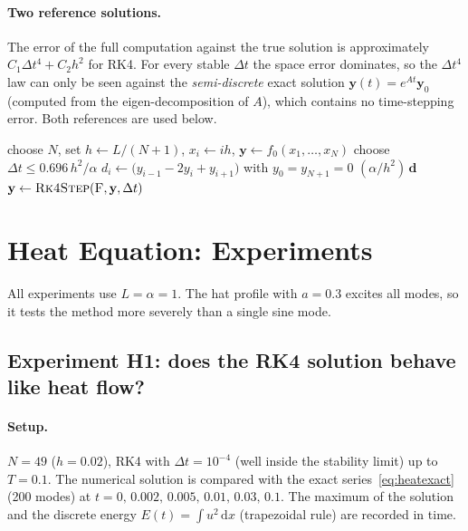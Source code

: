 \documentclass[11pt,a4paper]{article}
\newcommand{\dd}{\mathrm{d}}
\newcommand{\Dt}{\Delta t}
\newcommand{\bfy}{\mathbf{y}}
\begin{document}
\paragraph{Two reference solutions.} The error of the full computation against the true solution is
approximately $C_1\Dt^4+C_2h^2$ for RK4. For every stable $\Dt$ the space error dominates, so the
$\Dt^4$ law can only be seen against the \emph{semi-discrete} exact solution
$\bfy(t)=e^{At}\bfy_0$ (computed from the eigen-decomposition of $A$), which contains no time-stepping
error. Both references are used below.

\begin{algorithm}[H]
\caption{Method of lines for $u_t=\alpha u_{xx}$ with RK4}\label{alg:mol}
\begin{algorithmic}[1]
\State choose $N$, set $h\gets L/(N+1)$, $x_i\gets ih$, $\bfy\gets f_0(x_1,\dots,x_N)$
\State choose $\Dt\le 0.696\,h^2/\alpha$ 
\Function{F}{$\bfy$} 
  \State $d_i\gets\bigl(y_{i-1}-2y_i+y_{i+1}\bigr)$ with $y_0=y_{N+1}=0$
  \State \Return $(\alpha/h^2)\,\mathbf d$
\EndFunction
\For{$n=0,1,\dots,T/\Dt-1$}
  \State $\bfy\gets \textsc{Rk4Step}(\textsc{F},\bfy,\Dt)$ 
\EndFor
\end{algorithmic}
\end{algorithm}

\section{Heat Equation: Experiments}\label{sec:heatexp}

All experiments use $L=\alpha=1$. The hat profile with $a=0.3$ excites all modes, so it tests the
method more severely than a single sine mode.

\subsection{Experiment H1: does the RK4 solution behave like heat flow?}

\paragraph{Setup.} $N=49$ ($h=0.02$), RK4 with $\Dt=10^{-4}$ (well inside the stability limit) up to
$T=0.1$. The numerical solution is compared with the exact series~\eqref{eq:heatexact} (200 modes) at
$t=0,\,0.002,\,0.005,\,0.01,\,0.03,\,0.1$. The maximum of the solution and the discrete energy
$E(t)=\int u^2\,\dd x$ (trapezoidal rule) are recorded in time.
\end{document}
